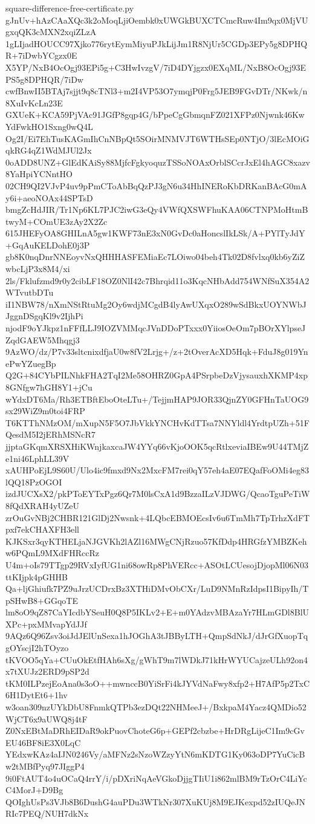 \documentclass[11pt]{article}
\theoremstyle{definition}
\theoremstyle{remark}
\begin{document}
\begin{filecontents*}[overwrite]{square-difference-free-certificate.py}
gJnUv+hAzCAaXQc3k2oMoqLjiOembk0xUWGkBUXCTCmcRuw4Im9qx0MjVUgxqQK3cMXN2xqiZLzA
1gLIjadHOUCC97Xjko776rytEymMiyuPJkLijJm1R8NjUr5CGDp3EPy5g8DPHQR+7iDwbYCgzx0E
X5YP/NxB4OcOgj93EPi5g+C3HwIvzgV/7iD4DYjgzx0EXqML/NxB8OcOgj93EPS5g8DPHQR/7iDw
cwfBnwII5BTAj7sjjt9q8cTNl3+m2I4VP53O7ymqjP0Frg5JEB9FGvDTr/NKwk/n8XuIvKcLn23E
GXUeK+KCA59PjVAc91JGfP8gqp4G/bPpeCgGbmqnFZ021XFPz0Njwnk46KwYdFwkHO1Sxng0wQ4L
Og2I/Ei7EhTusKAGmIhCnNBpQt5SOirMNMVJT6WTHsSEp0NTjO/3lEcMOiGqkRG4qZ1WdMJUl2Jx
0oADD8UNZ+GlEdKAiSy88MjfcFgkyoquzTSSoNOAxOrblSCcrJxEl4hAGC8xazv8YaHpiYCNntHO
02CH9QI2VJvP4uv9pPmCToAbBqQzPJ3gN6u34HhINERoKbDRKanBAcG0mAy6i+aeoNOAx44SPTsD
bmgZcHdJIR/Tr1Np6KL7PJC2iwG3eQy4VWfQXSWFhuKAA06CTNPMoHtmBtwyM+COmUE3zAy2X2Zc
615JHEFyOA8GHILnA5gw1KWF73nE3xN0GvDc0aHoncslIkLSk/A+PYlTyJdY+GqAuKELDohE0j3P
gb8K0nqDnrNNEoyvNxQHHHASFEMiaEc7LOiwo04beh4Tk02D8fvlxq0kb6yZiZwbcLjP3x8M4/xi
2ls/Fklufzmd9r0y2cibLF18OZ0NlI42c7Bhrqid11o3KqcNHbAdd754WNfSuX354A2WTvutbDTu
iI1NBW78/nXmNStRtuMg2Oy6wdjMCgdB4lyAwUXqxO289wSdBkxUOYNWbJJggnDSgqKl9v2IjhPi
njodF9oYJkpz1nFFfLLJ9IOZVMMqcJVnDDoPTxxx0YiiosOeOm7pBOrXYlpseJZqdGAEW5Mhqgj3
9AzWO/dz/P7v33sltcnixdfjaU0w8fV2Lrjg+/z+2tOverAcXD5Hqk+FduJ8g019YnePwYZuegBp
Q2G+84CYbPILNhkFHA2TqI2Me58OHRZ0GpA4PSrpbeDzVjysauxhXKMP4xp8GNfgw7hGH8Y1+jCu
wYdxDT6Ma/Rh3ETBftEboOteLTu+/TejjmHAP9JOR33QjnZY0GFHnTaUOG9sx29WiZ9m0toi4FRP
T6KTThNMzOM/mXupN5F5O7JbVkkYNCHvKdTTsa7NNYldl4YrdtpUZh+51FQesdM5I2jERhMSNcR7
jjptaGKqmXRSXHiKWnjkaxcaJW4YYq66vKjoOOK5qcRtlxeviaIBEw9U44TMjZe1ni46LphLL39V
xAUHPoEjL9S60U/Ulo4ic9fmxd9Nx2MxcFM7rei0qY57eh4aE07EQafFoOMi4eg83lQQ18PzOGOI
izdJUCXsX2/pkPToEYTxPgz6Qr7M0lsCxA1d9BzzaILzVJDWG/QcaoTguPeTiW8fQdXRAH4yUZeU
zrOuGvNBj2CHBR121GlDj2Nwsnk+4LQbcEBMOEcsIv6u6TmMh7TpTrhzXdFTpxf7ekCHAXFH3ell
KJKSxr3qyKTHELjaNJGVKh2lAZl16MWgCNjRzuo57KfDdp4HRGfzYMBZKehw6PQmL9MXdFHRccRz
U4m+oIs79TTgp29RVxIyfUG1ni68owRp8PhVERcc+ASOtLCUesojDjopMl06N03ttKIjpk4pGHHB
Qa+ljGhiufk7PZ9uJrzUCDrxBz3XTHiDMvObCXr/LuD9NMnRzIdpsI1BipyIh/TpSHwB8+GGqoTE
lm8oO9qZ87CaYIcdbYSeuH0Q8P5IKLv2+E+m0YAdzvMBAzaYr7HLmGDl8BlUXPc+pxMMvapYdJJf
9AQz6Q96Zsv3oiJdJElUnSexa1hJOGhA3tJBByLTH+QmpSdNkJ/dJrGfXuopTqgOYscjI2hTOyzo
tKVOO5qYa+CUuOkEtfHAh6sXg/gWhT9m7lWDkJ71kHrWYUCajzeULh92on4x7tXUJz2ERD9pSP2d
tKM0ILPzejEoAna0s3oO++mwnccB0YiSrFi4kJYVdNaFwy8xfp2+H7AfP5p2TxC6H1DytEt6+1hv
w3oan309nzUYkDbU8FnmkQTPb3ezDQt22NHMeeJ+/BxkpaM4Yacz4QMDio52WjCT6x9aUWQ8j4tF
Z0NxEBtMaDRhEIDaR9okPuovChoteG6p+GEPf2cbzbe+HrDRgLijeC1Im9cGvEU46BF8iE3X0LqC
YEdxwKAz4aIJN0246Vy/aMFNz2sNzoWZzyYtN6mKDTG1Ky063oDP7YuCicBw2tMBfPyq97JIggP4
9i0FtAUT4o4uOCaQ4rrY/i/pDXriNqAeVGkoDjjgTIiU1i862mlBM9rTzOrC4LiYcC4MorJ+D9Bg
QOIghUsPs3VJb8B6DushG4auPDu3WTkNr307XuKUj8M9EJKexpd52zIUQeJNRIc7PEQ/NUH7dkNx

\end{filecontents*}
\end{document}
